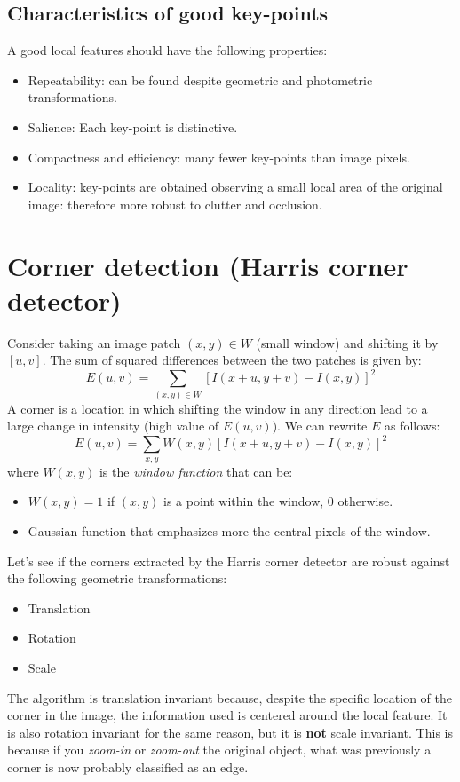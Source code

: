 \subsection{Characteristics of good key-points}
A good local features should have the following properties:
\begin{itemize}
    \item Repeatability: can be found despite geometric and photometric transformations.
    \item Salience: Each key-point is distinctive.
    \item Compactness and efficiency: many fewer key-points than image pixels.
    \item Locality: key-points are obtained observing a small local area of the original image: therefore more robust to clutter and occlusion.
    
\end{itemize}

\section{Corner detection (Harris corner detector)}
Consider taking an image patch $(x,y) \in W$ (small window) and shifting it by $[u,v]$. The sum of squared differences between the two patches is given by: 
\[E(u,v) = \sum_{(x,y)\in W}[I(x+u, y+v) - I(x,y)]^{2}\]
A corner is a location in which shifting the window in any direction lead to a large change in intensity (high value of $E(u,v)$). We can rewrite $E$ as follows:
\[E(u,v) = \sum_{x,y}W(x,y)[I(x + u, y + v) - I(x,y)]^{2}\]
where $W(x,y)$ is the \textit{window function} that can be:
\begin{itemize}
    \item $W(x,y) = 1$ if $(x,y)$ is a point within the window, 0 otherwise.
    \item Gaussian function that emphasizes more the central pixels of the window.
\end{itemize}
Let's see if the corners extracted by the Harris corner detector are robust against the following geometric transformations:
\begin{itemize}
    \item Translation
    \item Rotation
    \item Scale
\end{itemize}
The algorithm is translation invariant because, despite the specific location of the corner in the image, the information used is centered around the local feature. It is also rotation invariant for the same reason, but it is \textbf{not} scale invariant. This is because if you \textit{zoom-in} or \textit{zoom-out} the original object, what was previously a corner is now probably classified as an edge.

